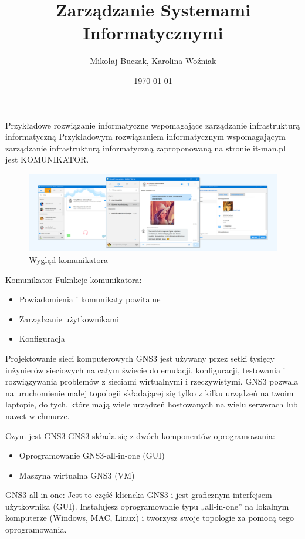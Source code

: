 \documentclass{beamer}
\title[M1.3]{Zarządzanie Systemami Informatycznymi}
\author{Mikołaj Buczak, Karolina Woźniak}
\institute{Politechnika Śląska}
\date{\today}
\begin{document}
\begin{frame}
  \titlepage
\end{frame}

\begin{frame}{Przykładowe rozwiązanie informatyczne wspomagające zarządzanie infrastrukturą informatyczną}
    Przykładowym rozwiązaniem informatycznym wspomagającym zarządzanie infrastrukturą informatyczną zaproponowaną na stronie it-man.pl jest KOMUNIKATOR.
    \begin{figure}[H!]
        \centering
        \includegraphics[width=\textwidth]{komunikator.PNG}
        \caption{Wygląd komunikatora}
        \label{fig:my_label}
    \end{figure}
\end{frame}

\begin{frame}{Komunikator}
    Fuknkcje komunikatora:
    \begin{itemize}
        \item Powiadomienia i komunikaty powitalne
        \item Zarządzanie użytkownikami
        \item Konfiguracja
        
    \end{itemize}
\end{frame}

\begin{frame}{Projektowanie sieci komputerowych}
   GNS3 jest używany przez setki tysięcy inżynierów sieciowych na całym świecie do emulacji, konfiguracji, testowania i rozwiązywania problemów z sieciami wirtualnymi i rzeczywistymi. GNS3 pozwala na uruchomienie małej topologii składającej się tylko z kilku urządzeń na twoim laptopie, do tych, które mają wiele urządzeń hostowanych na wielu serwerach lub nawet w chmurze.
\end{frame}

\begin{frame}{Czym jest GNS3}
    GNS3 składa się z dwóch komponentów oprogramowania: 
    \begin{itemize}
        \item  Oprogramowanie GNS3-all-in-one (GUI)
        \item Maszyna wirtualna GNS3 (VM)
    \end{itemize}
    GNS3-all-in-one: Jest to część kliencka GNS3 i jest graficznym interfejsem użytkownika (GUI). Instalujesz oprogramowanie typu „all-in-one” na lokalnym komputerze (Windows, MAC, Linux) i tworzysz swoje topologie za pomocą tego oprogramowania.
\end{frame}
\end{document}

